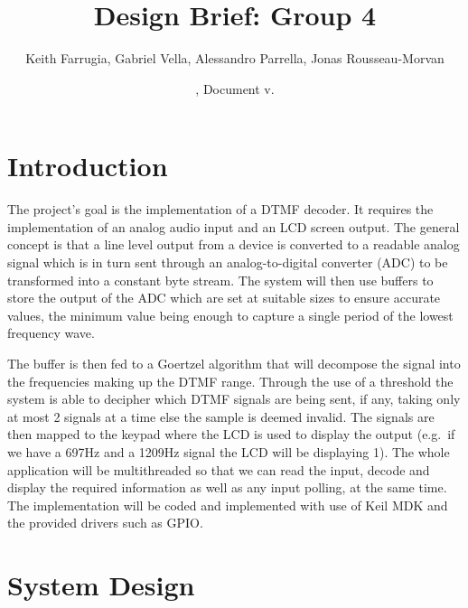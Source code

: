 \documentclass{cce2014-design}
\title{Design Brief: Group 4}
\author{Keith Farrugia, Gabriel Vella, Alessandro Parrella, Jonas
   Rousseau-Morvan }
\date{\svnMaxToday, Document v.\svnInfoMaxRevision}
\begin{document}
\maketitle



\section{Introduction}
The project's goal is the implementation of a DTMF decoder. It requires the 
implementation of an analog audio input and an LCD screen output. The general 
concept is that a line level output from a device is converted to a readable
analog signal which is in turn sent through an analog-to-digital converter (ADC)
to be transformed into a constant byte stream. The system will then use buffers
to store the output of the ADC which are set at suitable sizes to ensure 
accurate values, the minimum value being enough to capture a single period of 
the lowest frequency wave. 

The buffer is then fed to a  Goertzel algorithm that will decompose the signal 
into the frequencies making up the DTMF range. Through the use of a threshold
the system is able to decipher which DTMF signals are being sent, if any, 
taking only at most 2 signals at a time else the sample is deemed invalid. 
The signals are then mapped to the keypad where the LCD is used to display 
the output (e.g.\ if we have a 697Hz and a 1209Hz signal the LCD will be 
displaying 1). The whole application will be multithreaded so that we can 
read the input, decode and display the required information as well as
any input polling, at the same time. The implementation will be coded and 
implemented with use of Keil MDK and the provided drivers such as GPIO.


\section{System Design}
\end{document}
